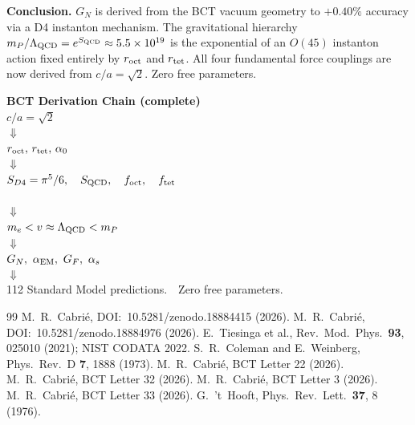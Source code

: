 \documentclass[aps,prl,twocolumn,superscriptaddress,floatfix]{revtex4-2}
\begin{document}
\medskip
\noindent\textbf{Conclusion.}
$G_N$ is derived from the BCT vacuum geometry to $+0.40\%$ accuracy via
a D4 instanton mechanism. The gravitational hierarchy
$m_P/\Lambda_{\rm QCD} = e^{S_{\rm QCD}} \approx 5.5\times10^{19}$
is the exponential of an $O(45)$ instanton action fixed entirely by
$r_{\rm oct}$ and $r_{\rm tet}$. All four fundamental force couplings
are now derived from $c/a = \sqrt{2}$. Zero free parameters.

\bigskip
\begin{center}
\begin{small}
\textbf{BCT Derivation Chain (complete)}\\[4pt]
$c/a = \sqrt{2}$\\
$\Downarrow$\\
$r_{\rm oct},\, r_{\rm tet},\, \alpha_0$\\
$\Downarrow$\\
$S_{D4} = \pi^5/6,\quad S_{\rm QCD},\quad f_{\rm oct},\quad f_{\rm tet}$\\\\
$\Downarrow$\\
$m_e < v \approx \Lambda_{\rm QCD} < m_P$\\
$\Downarrow$\\
$G_N,\ \alpha_{\rm EM},\ G_F,\ \alpha_s$\\
$\Downarrow$\\
112 Standard Model predictions.\ \ Zero free parameters.
\end{small}
\end{center}

\begin{thebibliography}{99}
 M.~R.~Cabri\'e,
  DOI:~10.5281/zenodo.18884415 (2026).
 M.~R.~Cabri\'e,
  DOI:~10.5281/zenodo.18884976 (2026).
 E.~Tiesinga et al., Rev.\ Mod.\ Phys.\ \textbf{93}, 025010 (2021);
  NIST CODATA 2022.
 S.~R.~Coleman and E.~Weinberg,
  Phys.\ Rev.\ D \textbf{7}, 1888 (1973).
 M.~R.~Cabri\'e, BCT Letter 22 (2026).
 M.~R.~Cabri\'e, BCT Letter 32 (2026).
 M.~R.~Cabri\'e, BCT Letter 3 (2026).
 M.~R.~Cabri\'e, BCT Letter 33 (2026).
 G.~'t~Hooft, Phys.\ Rev.\ Lett.\ \textbf{37}, 8 (1976).
\end{thebibliography}
\end{document}
